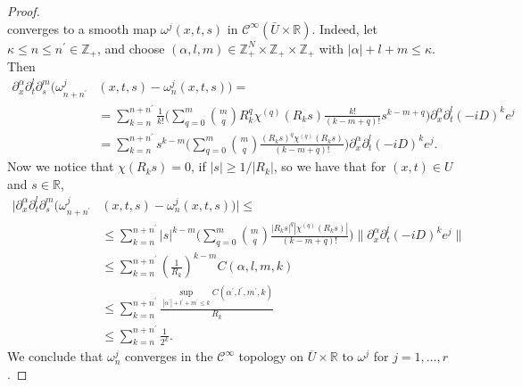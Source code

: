 \documentclass[10pt,a4paper]{amsart}
\begin{document}
\begin{proof}
{\begin{equation*}
	\end{equation*}
	converges to a smooth map 
	 ${\omega}^j(x,t,s)$ in $\mathcal{C}^\infty (\bar U \times \mathbb{R})$. 
	 Indeed, let $\kappa \leq n \leq  n^\prime \in \mathbb{Z}_+$, and choose $(\alpha, l, m) \in \mathbb{Z}_+^N \times \mathbb{Z}_+ \times \mathbb{Z}_+$ with $|\alpha| + l + m \leq \kappa $.
	Then
	\begin{align*}
		\partial_x^\alpha \partial_t^l \partial_s^m ({\omega}^j_{n+n^\prime}&(x,t,s) - {\omega}^j_n(x,t,s))  = \\
		&= \sum_{k=n}^{n + n^\prime} \frac{1}{k!} \bigg(\sum_{q=0}^m \binom{m}{q} R_k^q \chi^{(q)}(R_k s) \frac{k!}{(k-m+q)!} s^{k-m+q} \bigg) \partial_x^\alpha \partial_t^l (-iD)^k e^j \\
		& = \sum_{k=n}^{n + n^\prime} s^{k-m} \bigg(\sum_{q=0}^m \binom{m}{q} \frac{(R_k s)^q \chi^{(q)}(R_k s)}{(k-m+q)!} \bigg) \partial_x^\alpha \partial_t^l (-iD)^k e^j.
	\end{align*}	 
	Now we notice that $\chi(R_k s) = 0$, if $|s| \geq 1/|R_k|$, so we have that for $(x,t) \in U$ and $s \in \mathbb{R}$,
	\begin{align*}
		\big| \partial_x^\alpha \partial_t^l \partial_s^m ({\omega}^j_{n+n^\prime}&(x,t,s) - {\omega}^j_n(x,t,s)) \big| \leq \\
		& \leq \sum_{k=n}^{n + n^\prime} |s|^{k-m} \bigg(\sum_{q=0}^m \binom{m}{q} \frac{|R_k s|^q |\chi^{(q)}(R_k s)|}{(k-m+q)!} \bigg) \|\partial_x^\alpha \partial_t^l (-iD)^k e^j \| \\
		& \leq \sum_{k=n}^{n + n^\prime} \left(\frac{1}{R_k} \right)^{k-m} C(\alpha, l, m, k) \\
		& \leq \sum_{k=n}^{n + n^\prime} \frac{\sup_{|\alpha^\prime|+l^\prime + m^\prime \leq k}C(\alpha^\prime, l^\prime, m^\prime, k)}{R_k}  \\
		& \leq \sum_{k=n}^{n + n^\prime} \frac{1}{2^k}.
	\end{align*}	 
	We conclude that ${\omega}^j_n$ converges in the $\mathcal{C}^\infty$ topology on $\overline{U}\times \mathbb{R}$ to ${\omega}^j$ for $j=1,\dots, r$. 
	
}
\end{proof}
\end{document}
